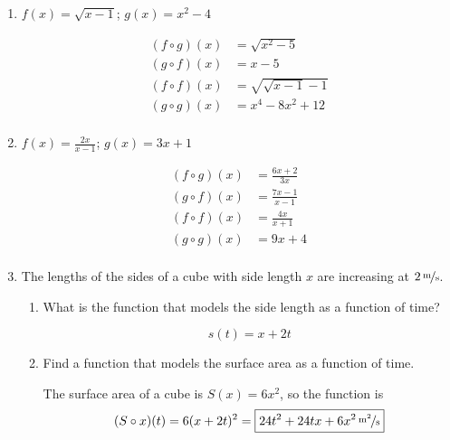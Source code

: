 \documentclass{exam}
\begin{document}
  \begin{enumerate}


    \item $f(x) = \sqrt{x - 1}$; $g(x) = x^2 - 4$
      \begin{solution}
        \begin{align*}
          (f \circ g)(x) &= \sqrt{x^2 - 5} \\
          (g \circ f)(x) &= x - 5 \\
          (f \circ f)(x) &= \sqrt{\sqrt{x - 1} - 1} \\
          (g \circ g)(x) &= x^4 - 8x^2 + 12 \\
        \end{align*}
      \end{solution}

    \item $f(x) = \frac{2x}{x - 1}$; $g(x) = 3x + 1$
      \begin{solution}
        \begin{align*}
          (f \circ g)(x) &= \frac{6x + 2}{3x} \\
          (g \circ f)(x) &= \frac{7x - 1}{x - 1} \\
          (f \circ f)(x) &= \frac{4x}{x + 1} \\
          (g \circ g)(x) &= 9x + 4 \\
        \end{align*}
      \end{solution}

    \ifprintanswers
      \pagebreak
    \fi

    \item 
      The lengths of the sides of a cube with side length $x$ are increasing at $\unitfrac[2]{m}{s}$.

      \begin{enumerate}[a]
        \item What is the function that models the side length as a function of time?
          \begin{solution}
            \[ \boxed{s(t) = x + 2t} \]
          \end{solution}

        \item Find a function that models the surface area as a function of time.
          \begin{solution}
              The surface area of a cube is $S(x) = 6x^2$, so the function is 
              \[
                (S \circ x)(t) = 6 (x + 2t)^2 = \boxed{\unitfrac[24t^2 + 24tx + 6x^2]{m^2}{s}}
              \]
          \end{solution}


\end{enumerate}
\end{enumerate}
\end{document}
